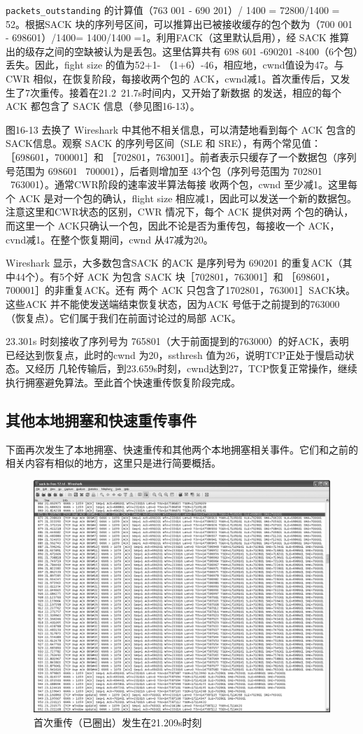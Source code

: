\verb|packets_outstanding| 的计算值（763 001 - 690 201）/ 1400 = 72800/1400 = 52。根据SACK 块的序列号区间，可以推算出已被接收缓存的包个数为（700 001 - 698601）/1400=
1400/1400 =1。利用FACK（这里默认启用），经 SACK 推算出的级存之间的空缺被认为是丢包。这里估算共有 698 601 -690201 -8400（6个包）丢失。因此，fight size 的值为52+1-
（1+6）-46，相应地，cwnd值设为47。与CWR 相似，在恢复阶段，每接收两个包的 ACK，cwnd减1。首次重传后，又发生了7次重传。接着在21.2~21.7s时间内，又开始了新数据
的发送，相应的每个 ACK 都包含了 SACK 信息（參见图16-13）。

图16-13 去换了 Wireshark 中其他不相关信息，可以清楚地看到每个 ACK 包含的SACK信息。观察 SACK 的序列号区间（SLE 和 SRE），有两个常见值：［698601，700001］和
［702801，763001］。前者表示只缓存了一个数据包（序列号范围为 698601 ~700001），后者则增加至 43个包（序列号范围为 702801 ~763001）。通常CWR阶段的速率波半算法每接
收两个包，cwnd 至少减1。这里每个 ACK 是对一个包的确认，flight size 相应减1，因此可以发送一个新的数据包。注意这里和CWR状态的区别，CWR 情况下，每个 ACK 提供对两
个包的确认，而这里一个 ACK只确认一个包，因此不论是否为重传包，每接收一个 ACK，cvnd减1。在整个恢复期间，cwnd 从47减为20。

Wireshark 显示，大多数包含SACK 的ACK 是序列号为 690201 的重复ACK（其中44个）。有5个好 ACK 为包含 SACK 块［702801，763001］和 ［698601，700001］的非重复ACK。还有
两个 ACK 只包含了1702801，763001］SACK块。这些ACK 并不能使发送端结束恢复状态，因为ACK 号低于之前提到的763000（恢复点）。它们属于我们在前面讨论过的局部 ACK。

23.301s 时刻接收了序列号为 765801（大于前面提到的763000）的好ACK，表明已经达到恢复点，此时的cwnd 为20，ssthresh 值为26，说明TCP正处于慢启动状态。又经历
几轮传输后，到23.659s时刻，cwnd达到27，TCP恢复正常操作，继续执行拥塞避免算法。至此首个快速重传恢复阶段完成。

\subsection{其他本地拥塞和快速重传事件}
下面再次发生了本地拥塞、快速重传和其他两个本地拥塞相关事件。它们和之前的相关内容有相似的地方，这里只是进行简要概括。
\begin{figure}[!htb]
    \centering
	\includegraphics[width=1\textwidth]{imgs/16/16-13.png}
	\caption{首次重传（已圈出）发生在21.209s时刻}
\end{figure}
